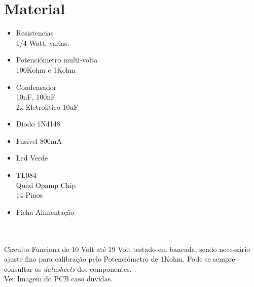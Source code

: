 \documentclass[titlepage, a4paper, 10pt, reqno, openany]{report}
\begin{document}
\section{Material}
\begin{minipage}[t]{.60\linewidth}
	\begin{itemize}
		\setlength\itemsep{-0.5em}
		\item Resistencias \\
		1/4 Watt, varias.
		\item Potenciómetro multi-volta \\
		100Kohm e 1Kohm
		\item Condensador \\
		10nF, 100nF  \\
		2x Eletrolítico 10uF
		\item Diodo 1N4148 \\
		\item Fusível 800mA \\
		\item Led Verde \\
	\end{itemize}
\end{minipage}
\begin{minipage}[t]{.31\linewidth}
	\begin{itemize}
		\setlength\itemsep{-0.5em}
		\item TL084 \\
		Quad Opamp Chip \\
		14 Pinos \\
		\item Ficha Alimentação \\
	\end{itemize}
\end{minipage}\\
\\
Circuito Funciona de 10 Volt até 19 Volt testado em bancada, sendo necessário ajuste fino para calibração pelo Potenciómetro de  1Kohm. 
Pode se sempre consultar os {\it datasheets} dos componentes.\\

Ver Imagem do PCB caso duvidas. \\
\end{document}
